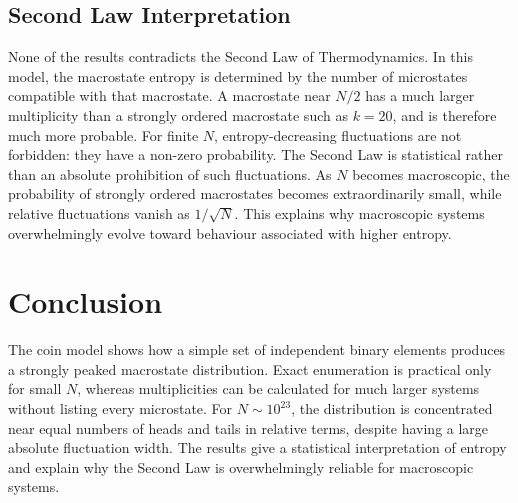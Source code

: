 \documentclass[10pt,a4paper]{article}
\begin{document}
\subsection{Second Law Interpretation}
None of the results contradicts the Second Law of Thermodynamics. In this model, the macrostate entropy is determined by the number of microstates compatible with that macrostate. A macrostate near $N/2$ has a much larger multiplicity than a strongly ordered macrostate such as $k=20$, and is therefore much more probable. For finite $N$, entropy-decreasing fluctuations are not forbidden: they have a non-zero probability. The Second Law is statistical rather than an absolute prohibition of such fluctuations. As $N$ becomes macroscopic, the probability of strongly ordered macrostates becomes extraordinarily small, while relative fluctuations vanish as $1/\sqrt N$. This explains why macroscopic systems overwhelmingly evolve toward behaviour associated with higher entropy.

\section{Conclusion}
The coin model shows how a simple set of independent binary elements produces a strongly peaked macrostate distribution. Exact enumeration is practical only for small $N$, whereas multiplicities can be calculated for much larger systems without listing every microstate. For $N\sim10^{23}$, the distribution is concentrated near equal numbers of heads and tails in relative terms, despite having a large absolute fluctuation width. The results give a statistical interpretation of entropy and explain why the Second Law is overwhelmingly reliable for macroscopic systems.

\appendix
\end{document}
